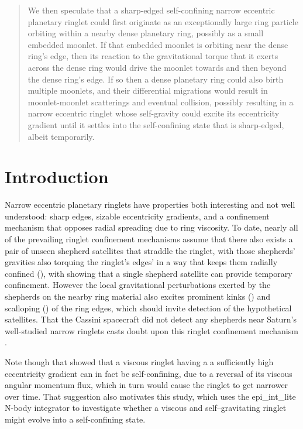 \documentclass[preprint]{aastex62}
\begin{document}
\begin{abstract}
We then speculate that a sharp-edged self-confining narrow eccentric planetary ringlet could first originate as
an exceptionally large ring particle orbiting within a nearby dense planetary ring, possibly 
as a small embedded moonlet. If that embedded moonlet is orbiting near the dense ring's edge, then
its reaction to the gravitational torque that it exerts across the dense ring would
drive the moonlet towards and then beyond the dense ring's edge. 
If so then a dense planetary ring could also birth multiple moonlets, 
and their differential migrations would result in moonlet-moonlet scatterings and eventual collision,
possibly resulting in a narrow eccentric ringlet
whose self-gravity could excite its eccentricity gradient
until it settles into the self-confining state that is sharp-edged, albeit temporarily. 

\end{abstract}




\section{Introduction}
\label{sec:intro}

Narrow eccentric planetary ringlets have properties both interesting and
not well understood: sharp edges,
sizable eccentricity gradients, and a confinement mechanism that
opposes radial spreading due to ring viscosity. To date, nearly all of the
prevailing ringlet confinement mechanisms assume that there also exists a pair of 
unseen shepherd satellites that straddle the ringlet, with those shepherds' gravities
also torquing the ringlet's edges' in a way that keeps them radially confined 
(\citealt{GT79, GT79c, GT81, CG00, ME02}), with \cite{Getal95} showing
that a single shepherd satellite can provide temporary confinement.
However the local gravitational perturbations exerted by 
the shepherds on the nearby ring material also excites prominent kinks (\citealt{Metal05}) and 
scalloping (\citealt{Wetal09}) of the ring edges,
which should invite detection of the hypothetical satellites.
That the Cassini spacecraft did not detect any shepherds near Saturn's
well-studied narrow ringlets casts doubt upon this ringlet confinement 
mechanism \citep{L18}. 

Note though that \cite{BGT82} showed that a viscous ringlet having a
a sufficiently high eccentricity gradient can in fact be self-confining,
due to a reversal of its viscous angular momentum flux, which in turn would
cause the ringlet to get narrower over time. 
That suggestion also motivates this study,
which uses the epi\_int\_lite N-body integrator to investigate whether a 
viscous and self--gravitating ringlet might evolve into a self-confining state.
\end{document}
